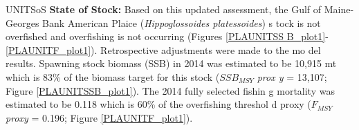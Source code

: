 UNITSoS{ \textbf{State of Stock: }{}Based on this updated assessment, the Gulf 
of Maine-Georges Bank American Plaice (\textit{Hippoglossoides platessoides}) s
tock is not overfished and overfishing is not occurring (Figures \ref{PLAUNITSS
B_plot1}-\ref{PLAUNITF_plot1}){}. Retrospective adjustments were made to the mo
del results. Spawning stock biomass (SSB) in 2014 was estimated to be 10,915 mt
 which is 83\% of the biomass target for this stock ($SSB_{MSY}${} \textit{prox
y}{} = 13,107; Figure \ref{PLAUNITSSB_plot1}{}). The 2014 fully selected fishin
g mortality was estimated to be 0.118 which is 60\% of the overfishing threshol
d proxy ($F_{MSY}${} \textit{proxy}{} = 0.196; Figure \ref{PLAUNITF_plot1}{}).}
 \def\PLAUNITProj{ \textbf{Projections: }{}Short term projections of biomass we
re derived by sampling from an empirical cumulative distribution function of 34
 recruitment estimates from VPA model results. The annual fishery selectivity, 
maturity ogive, and mean weights at age used in projections are the most recent
 5 year averages; retrospective adjustments were applied in the projections.} \
